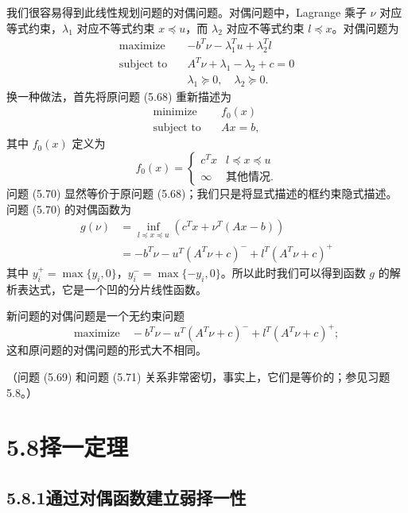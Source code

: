\documentclass[UTF8,12pt,a4paper,fontset=fandol]{ctexart}
\begin{document}
我们很容易得到此线性规划问题的对偶问题。对偶问题中，Lagrange 乘子 $\nu$ 对应等式约束，$\lambda_1$ 对应不等式约束 $x\preceq u$，而 $\lambda_2$ 对应不等式约束 $l\preceq x$。对偶问题为
\begin{equation}
\begin{aligned}
\text{maximize}\quad & -b^T\nu-\lambda_1^Tu+\lambda_2^Tl\\
\text{subject to}\quad & A^T\nu+\lambda_1-\lambda_2+c=0\\
& \lambda_1\succeq 0,\quad \lambda_2\succeq 0.
\end{aligned}
\tag{5.69}
\end{equation}
换一种做法，首先将原问题 (5.68) 重新描述为
\begin{equation}
\begin{aligned}
\text{minimize}\quad & f_0(x)\\
\text{subject to}\quad & Ax=b,
\end{aligned}
\tag{5.70}
\end{equation}
其中 $f_0(x)$ 定义为
\[
f_0(x)=
\begin{cases}
c^Tx & l\preceq x\preceq u\\
\infty & \text{其他情况}.
\end{cases}
\]
问题 (5.70) 显然等价于原问题 (5.68)；我们只是将显式描述的框约束隐式描述。问题 (5.70) 的对偶函数为
\[
\begin{aligned}
g(\nu)
&=\inf_{l\preceq x\preceq u}(c^Tx+\nu^T(Ax-b))\\
&=-b^T\nu-u^T(A^T\nu+c)^-+l^T(A^T\nu+c)^+
\end{aligned}
\]
其中 $y_i^+=\max\{y_i,0\}$，$y_i^-=\max\{-y_i,0\}$。所以此时我们可以得到函数 $g$ 的解析表达式，它是一个凹的分片线性函数。

新问题的对偶问题是一个无约束问题
\begin{equation}
\text{maximize}\quad -b^T\nu-u^T(A^T\nu+c)^-+l^T(A^T\nu+c)^+;
\tag{5.71}
\end{equation}
这和原问题的对偶问题的形式大不相同。

（问题 (5.69) 和问题 (5.71) 关系非常密切，事实上，它们是等价的；参见习题 5.8。）

\section*{5.8\quad 择一定理}

\subsection*{5.8.1\quad 通过对偶函数建立弱择一性}
\end{document}
